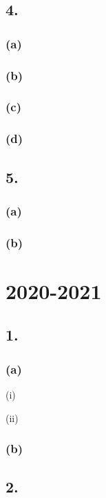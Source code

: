 \documentclass{article}
\begin{document}
\subsection*{4.}
\subsubsection*{(a)}
\subsubsection*{(b)}
\subsubsection*{(c)}
\subsubsection*{(d)}

\subsection*{5.}
\subsubsection*{(a)}
\subsubsection*{(b)}

\clearpage


\section*{2020-2021}
\subsection*{1.}
\subsubsection*{(a)}
(i)\par
(ii)\par
\subsubsection*{(b)}

\subsection*{2.}
\end{document}
